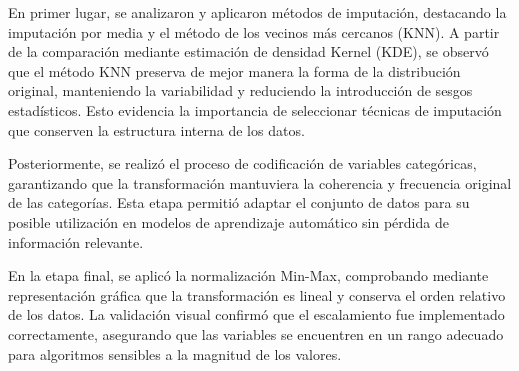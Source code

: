 \documentclass[12pt]{article}
\begin{document}
En primer lugar, se analizaron y aplicaron métodos de imputación, destacando la imputación por media y el método de los vecinos más cercanos (KNN). A partir de la comparación mediante estimación de densidad Kernel (KDE), se observó que el método KNN preserva de mejor manera la forma de la distribución original, manteniendo la variabilidad y reduciendo la introducción de sesgos estadísticos. Esto evidencia la importancia de seleccionar técnicas de imputación que conserven la estructura interna de los datos.

Posteriormente, se realizó el proceso de codificación de variables categóricas, garantizando que la transformación mantuviera la coherencia y frecuencia original de las categorías. Esta etapa permitió adaptar el conjunto de datos para su posible utilización en modelos de aprendizaje automático sin pérdida de información relevante.

En la etapa final, se aplicó la normalización Min-Max, comprobando mediante representación gráfica que la transformación es lineal y conserva el orden relativo de los datos. La validación visual confirmó que el escalamiento fue implementado correctamente, asegurando que las variables se encuentren en un rango adecuado para algoritmos sensibles a la magnitud de los valores.

\printbibliography[title={ Bibliográficas}]
\end{document}
